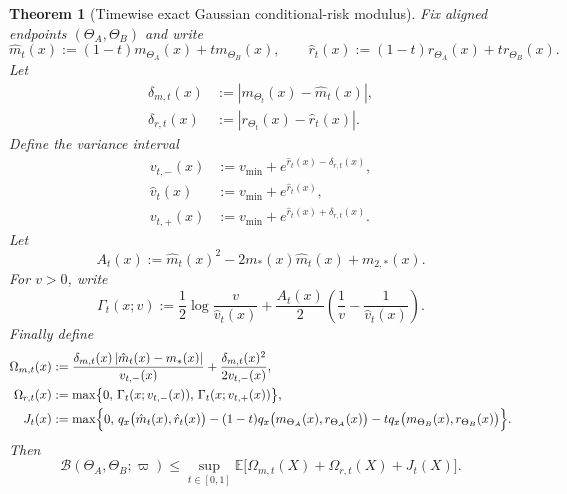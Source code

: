 \documentclass[11pt]{article}
\newtheorem{theorem}{Theorem}[section]
\theoremstyle{definition}
\newcommand{\E}{\mathbb{E}}
\newcommand{\abs}[1]{\left\lvert #1 \right\rvert}
\newcommand{\cB}{\mathcal{B}}
\begin{document}
\begin{theorem}[Timewise exact Gaussian conditional-risk modulus]
\label{thm:timewise-exact-gaussian-modulus}
Fix aligned endpoints $(\Theta_A,\Theta_B)$ and write
\[
  \hat m_t(x):=(1-t)m_{\Theta_A}(x)+t m_{\Theta_B}(x),
  \qquad
  \hat r_t(x):=(1-t)r_{\Theta_A}(x)+t r_{\Theta_B}(x).
\]
Let
\begin{align}
  \delta_{m,t}(x)
  &:=
  \abs{m_{\Theta_t}(x)-\hat m_t(x)},
  \label{eq:delta-m-time}
  \\
  \delta_{r,t}(x)
  &:=
  \abs{r_{\Theta_t}(x)-\hat r_t(x)}.
  \label{eq:delta-r-time}
\end{align}
Define the variance interval
\begin{align}
  v_{t,-}(x)
  &:=
  v_{\min}+e^{\hat r_t(x)-\delta_{r,t}(x)},
  \label{eq:v-minus-time}
  \\
  \hat v_t(x)
  &:=
  v_{\min}+e^{\hat r_t(x)},
  \label{eq:v-hat-time}
  \\
  v_{t,+}(x)
  &:=
  v_{\min}+e^{\hat r_t(x)+\delta_{r,t}(x)}.
  \label{eq:v-plus-time}
\end{align}
Let
\begin{equation}
  A_t(x):=\hat m_t(x)^2-2m_\ast(x)\hat m_t(x)+m_{2,\ast}(x).
  \label{eq:A-time}
\end{equation}
For $v>0$, write
\begin{equation}
  \Gamma_t(x;v)
  :=
  \frac12\log\frac{v}{\hat v_t(x)}
  +
  \frac{A_t(x)}{2}
  \left(
    \frac{1}{v}-\frac{1}{\hat v_t(x)}
  \right).
  \label{eq:Gamma-time}
\end{equation}
Finally define
\begin{align}
  \Omega_{m,t}(x)
  &:=
  \frac{\delta_{m,t}(x)\abs{\hat m_t(x)-m_\ast(x)}}{v_{t,-}(x)}
  +
  \frac{\delta_{m,t}(x)^2}{2v_{t,-}(x)},
  \label{eq:Omega-m-time}
  \\
  \Omega_{r,t}(x)
  &:=
  \max\bigl\{
    0,\,
    \Gamma_t(x;v_{t,-}(x)),\,
    \Gamma_t(x;v_{t,+}(x))
  \bigr\},
  \label{eq:Omega-r-time}
  \\
  J_t(x)
  &:=
  \max\Bigl\{
    0,\,
    q_x\bigl(\hat m_t(x),\hat r_t(x)\bigr)
    -
    (1-t)q_x\bigl(m_{\Theta_A}(x),r_{\Theta_A}(x)\bigr)
    -
    t q_x\bigl(m_{\Theta_B}(x),r_{\Theta_B}(x)\bigr)
  \Bigr\}.
  \label{eq:Jt-gaussian}
\end{align}
Then
\begin{equation}
  \cB(\Theta_A,\Theta_B;\varpi)
  \le
  \sup_{t\in[0,1]}
  \E\bigl[
    \Omega_{m,t}(X)+\Omega_{r,t}(X)+J_t(X)
  \bigr].
  \label{eq:timewise-exact-gaussian-modulus}
\end{equation}
\end{theorem}
\end{document}
